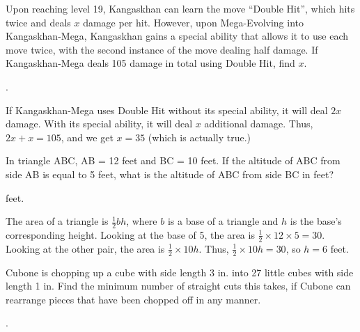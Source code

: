 \documentclass[11pt]{article}
\begin{document}
\begin{problem}
Upon reaching level 19, Kangaskhan can learn the move ``Double Hit'', which hits twice and deals $x$ damage per hit. However, upon Mega-Evolving into Kangaskhan-Mega, Kangaskhan gains a special ability that allows it to use each move twice, with the second instance of the move dealing half damage. If Kangaskhan-Mega deals 105 damage in total using Double Hit, find $x$.
\end{problem}

\begin{answer}
.
\end{answer}

\begin{solution}
If Kangaskhan-Mega uses Double Hit without its special ability, it will deal $2x$ damage. With its special ability, it will deal $x$ additional damage. Thus, $2x + x = 105$, and we get $x = \boxed{35}$ (which is actually true.)
\end{solution}

\begin{problem}
In triangle ABC, AB = 12 feet and BC = 10 feet. If the altitude of ABC from side AB is equal to 5 feet, what is the altitude of ABC from side BC in feet?
\end{problem}

\begin{answer}
 feet.
\end{answer}

\begin{solution}
The area of a triangle is $\frac{1}{2}bh$, where $b$ is a base of a triangle and $h$ is the base's corresponding height. Looking at the base of 5, the area is $\frac{1}{2} \times 12 \times 5 = 30$. Looking at the other pair, the area is $\frac{1}{2} \times 10h$. Thus, $\frac{1}{2} \times 10 h = 30$, so $h = \boxed{6}$ feet.
\end{solution}

\begin{problem}
Cubone is chopping up a cube with side length 3 in. into 27 little cubes with side length 1 in. Find the minimum number of straight cuts this takes, if Cubone can rearrange pieces that have been chopped off in any manner.
\end{problem}

\begin{answer}
.
\end{answer}
\end{document}
